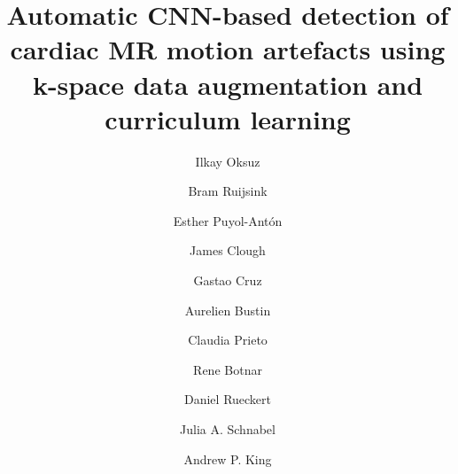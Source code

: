 \documentclass[preprint,12pt,authoryear]{elsarticle}
\begin{document}



\begin{frontmatter}
\title{Automatic CNN-based detection of cardiac MR motion artefacts using k-space data augmentation and curriculum learning}

\author[KCL]{Ilkay Oksuz}

\author[KCL,NHS]{Bram Ruijsink}
\author[KCL]{Esther Puyol-Ant\'on}
\author[KCL]{James Clough}
\author[KCL]{Gastao Cruz}
\author[KCL]{Aurelien Bustin}
\author[KCL]{Claudia Prieto}
\author[KCL]{Rene Botnar}
\author[Imperial]{Daniel Rueckert}
\author[KCL]{Julia A. Schnabel}
\author[KCL]{Andrew P. King}

\address[KCL]{School of Biomedical Engineering \& Imaging Sciences, King\textquotesingle s College London, U.K}
\address[NHS]{Guy\textquotesingle s and St Thomas\textquotesingle{} Hospital NHS Foundation Trust, London, UK.}
\address[Imperial]{Biomedical Image Analysis Group, Imperial College London, UK.}



\begin{abstract}


\end{abstract}
\end{frontmatter}
\end{document}
